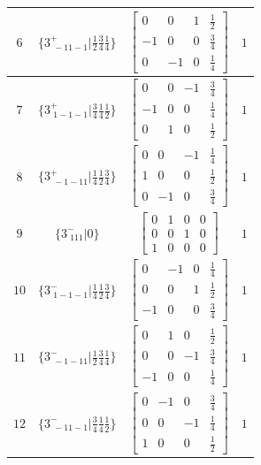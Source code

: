 \documentclass[fleqn,8pt]{jsarticle}
\begin{document}
\begin{longtable}{cccc}
$ 6 $ & $ \{3^{+}_{\,\,-11-1}|\frac{1}{2} \frac{3}{4} \frac{1}{4}\} $ & $ \begin{bmatrix} 0 & 0 & 1 & \frac{1}{2} \\ -1 & 0 & 0 & \frac{3}{4} \\ 0 & -1 & 0 & \frac{1}{4} \end{bmatrix} $ & $ 1 $ \\ \hline
$ 7 $ & $ \{3^{+}_{\,\,1-1-1}|\frac{3}{4} \frac{1}{4} \frac{1}{2}\} $ & $ \begin{bmatrix} 0 & 0 & -1 & \frac{3}{4} \\ -1 & 0 & 0 & \frac{1}{4} \\ 0 & 1 & 0 & \frac{1}{2} \end{bmatrix} $ & $ 1 $ \\ \hline
$ 8 $ & $ \{3^{+}_{\,\,-1-11}|\frac{1}{4} \frac{1}{2} \frac{3}{4}\} $ & $ \begin{bmatrix} 0 & 0 & -1 & \frac{1}{4} \\ 1 & 0 & 0 & \frac{1}{2} \\ 0 & -1 & 0 & \frac{3}{4} \end{bmatrix} $ & $ 1 $ \\ \hline
$ 9 $ & $ \{3^{-}_{\,\,111}|0\} $ & $ \begin{bmatrix} 0 & 1 & 0 & 0 \\ 0 & 0 & 1 & 0 \\ 1 & 0 & 0 & 0 \end{bmatrix} $ & $ 1 $ \\ \hline
$ 10 $ & $ \{3^{-}_{\,\,1-1-1}|\frac{1}{4} \frac{1}{2} \frac{3}{4}\} $ & $ \begin{bmatrix} 0 & -1 & 0 & \frac{1}{4} \\ 0 & 0 & 1 & \frac{1}{2} \\ -1 & 0 & 0 & \frac{3}{4} \end{bmatrix} $ & $ 1 $ \\ \hline
$ 11 $ & $ \{3^{-}_{\,\,-1-11}|\frac{1}{2} \frac{3}{4} \frac{1}{4}\} $ & $ \begin{bmatrix} 0 & 1 & 0 & \frac{1}{2} \\ 0 & 0 & -1 & \frac{3}{4} \\ -1 & 0 & 0 & \frac{1}{4} \end{bmatrix} $ & $ 1 $ \\ \hline
$ 12 $ & $ \{3^{-}_{\,\,-11-1}|\frac{3}{4} \frac{1}{4} \frac{1}{2}\} $ & $ \begin{bmatrix} 0 & -1 & 0 & \frac{3}{4} \\ 0 & 0 & -1 & \frac{1}{4} \\ 1 & 0 & 0 & \frac{1}{2} \end{bmatrix} $ & $ 1 $ \\ \hline

\end{longtable}
\end{document}
